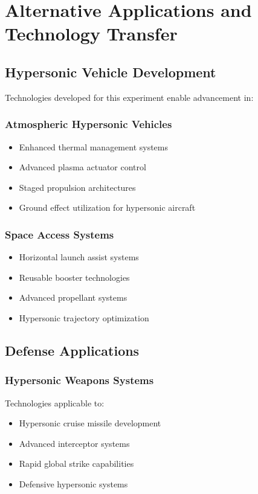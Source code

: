 \documentclass[12pt,a4paper]{article}
\begin{document}
\section{Alternative Applications and Technology Transfer}

\subsection{Hypersonic Vehicle Development}

Technologies developed for this experiment enable advancement in:

\subsubsection{Atmospheric Hypersonic Vehicles}
\begin{itemize}
\item Enhanced thermal management systems
\item Advanced plasma actuator control
\item Staged propulsion architectures  
\item Ground effect utilization for hypersonic aircraft
\end{itemize}

\subsubsection{Space Access Systems}
\begin{itemize}
\item Horizontal launch assist systems
\item Reusable booster technologies
\item Advanced propellant systems
\item Hypersonic trajectory optimization
\end{itemize}

\subsection{Defense Applications}

\subsubsection{Hypersonic Weapons Systems}
Technologies applicable to:
\begin{itemize}
\item Hypersonic cruise missile development
\item Advanced interceptor systems
\item Rapid global strike capabilities
\item Defensive hypersonic systems
\end{itemize}
\end{document}
